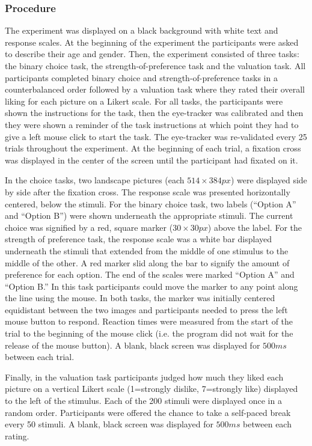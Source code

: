 \documentclass[doc, a4paper, apacite]{apa6}
\begin{document}
\subsubsection{Procedure}
The experiment was displayed on a black background with white text and response scales. At the beginning of the experiment the participants were asked to describe their age and gender. Then, the experiment consisted of three tasks: the binary choice task, the strength-of-preference task and the valuation task. All participants completed binary choice and strength-of-preference tasks in a counterbalanced order followed by a valuation task where they rated their overall liking for each picture on a Likert scale. For all tasks, the participants were shown the instructions for the task, then the eye-tracker was calibrated and then they were shown a reminder of the task instructions at which point they had to give a left mouse click to start the task. The eye-tracker was re-validated every 25 trials throughout the experiment. At the beginning of each trial, a fixation cross was displayed in the center of the screen until the participant had fixated on it. 

In the choice tasks, two landscape pictures (each $514 \times 384px$) were displayed side by side after the fixation cross. The response scale was presented horizontally centered, below the stimuli. For the binary choice task, two labels (``Option A'' and ``Option B'') were shown underneath the appropriate stimuli. The current choice was signified by a red, square marker ($30 \times 30px$) above the label. For the strength of preference task, the response scale was a white bar displayed underneath the stimuli that extended from the middle of one stimulus to the middle of the other. A red marker slid along the bar to signify the amount of preference for each option. The end of the scales were marked ``Option A'' and ``Option B.'' In this task participants could move the marker to any point along the line using the mouse. In both tasks, the marker was initially centered equidistant between the two images and participants needed to press the left mouse button to respond. Reaction times were measured from the start of the trial to the beginning of the mouse click (i.e. the program did not wait for the release of the mouse button). A blank, black screen was displayed for $500ms$ between each trial.

Finally, in the valuation task participants judged how much they liked each picture on a vertical Likert scale (1=strongly dislike, 7=strongly like) displayed to the left of the stimulus. Each of the 200 stimuli were displayed once in a random order. Participants were offered the chance to take a self-paced break every 50 stimuli. A blank, black screen was displayed for $500ms$ between each rating. 
\end{document}
